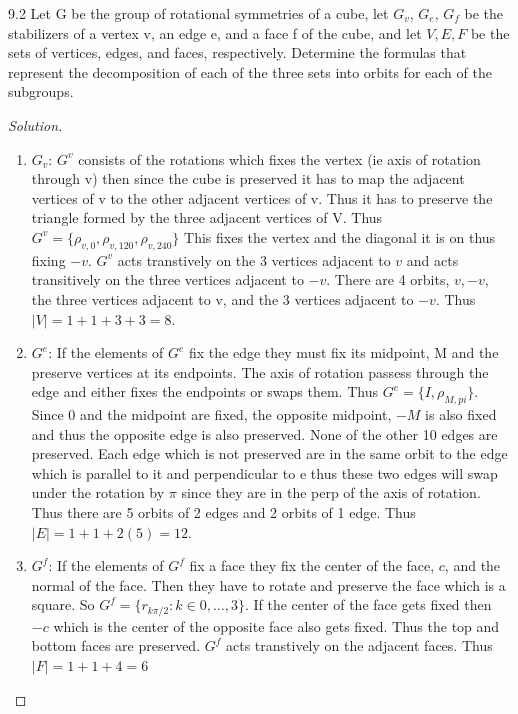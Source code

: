\documentclass{article}
\newenvironment{solution}
{\renewcommand\qedsymbol{$\blacksquare$}\begin{proof}[Solution]}
{\end{proof}}
\begin{document}
\begin{PROB}{9.2}\label{Problem 9.2.}
    Let G be the group of rotational symmetries of a cube, let $G_v$, $G_e$, $G_f$ be the stabilizers of a vertex v, an edge e, and a face f of the cube, and let $V, E, F$ be the sets of vertices, edges, and faces, respectively. Determine the formulas that represent the decomposition of each of the three sets into orbits for each of the subgroups.
\end{PROB}
\begin{solution}
    \begin{enumerate}{}
        \item $G_v$: $G^v$ consists of the rotations which fixes the vertex (ie axis of rotation through v) then since the cube is preserved it has to map the adjacent vertices of v to the other adjacent vertices of v. Thus it has to preserve the triangle formed by the three adjacent vertices of V. Thus $G^v = \{\rho_{v, 0}, \rho_{v, 120}, \rho_{v, 240}\}$ This fixes the vertex and the diagonal it is on thus fixing $-v$. $G^v$ acts transtively on the 3 vertices adjacent to $v$ and acts transitively on the three vertices adjacent to $-v$. There are 4 orbits, $v, -v,$ the three vertices adjacent to v, and the 3 vertices adjacent to $-v$. Thus $|V| = 1 + 1 + 3 + 3 = 8$. 
        \item $G^e$: If the elements of $G^e$ fix the edge they must fix its midpoint, M and the preserve vertices at its endpoints. The axis of rotation passess through the edge and either fixes the endpoints or swaps them. Thus $G^e = \{I, \rho_{M, pi}\}$. Since 0 and the midpoint are fixed, the opposite midpoint, $-M$ is also fixed and thus the opposite edge is also preserved. None of the other 10 edges are preserved. Each edge which is not preserved are in the same orbit to the edge which is parallel to it and perpendicular to e thus these two edges will swap under the rotation by $\pi$ since they are in the perp of the axis of rotation. Thus there are 5 orbits of 2 edges and 2 orbits of 1 edge. Thus $|E| = 1 + 1 + 2(5) = 12$.
        \item $G^f$: If the elements of $G^f$ fix a face they fix the center of the face, $c$, and the normal of the face. Then they have to rotate and preserve the face which is a square. So $G^f = \{r_{k\pi/2} : k \in 0, \ldots, 3\}$. If the center of the face gets fixed then $-c$ which is the center of the opposite face also gets fixed. Thus the top and bottom faces are preserved. $G^f$ acts transtively on the adjacent faces. Thus $|F| = 1 + 1 + 4 = 6$
    \end{enumerate}
\end{solution}
\end{document}
